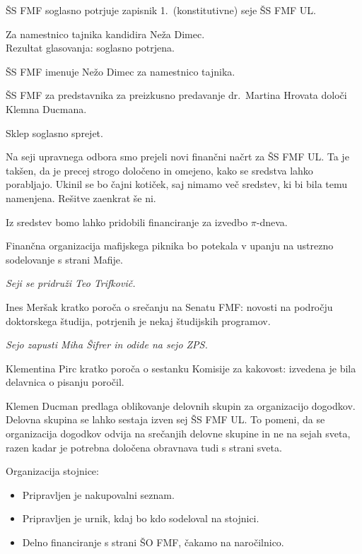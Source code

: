 \documentclass{seja}
\begin{document}
\begin{ad}

\item
  ŠS FMF soglasno potrjuje zapisnik 1.~(konstitutivne) seje ŠS FMF UL.

\item 
  Za namestnico tajnika kandidira Neža Dimec. \\
  Rezultat glasovanja: soglasno potrjena.
  
  \begin{sklep*}
    ŠS FMF imenuje Nežo Dimec za namestnico tajnika.
  \end{sklep*}
  
\item
  \begin{sklep}
    ŠS FMF za predstavnika za preizkusno predavanje dr.~Martina Hrovata določi Klemna Ducmana.
  \end{sklep}
  Sklep soglasno sprejet.
  
\item
  Na seji upravnega odbora smo prejeli novi finančni načrt za ŠS FMF UL. Ta je takšen, da je precej strogo določeno in omejeno, kako se sredstva lahko porabljajo. Ukinil se bo čajni kotiček, saj nimamo več sredstev, ki bi bila temu namenjena. Rešitve zaenkrat še ni.
  
  Iz sredstev bomo lahko pridobili financiranje za izvedbo $\pi$-dneva.
  
  Finančna organizacija mafijskega piknika bo potekala v upanju na ustrezno sodelovanje s strani Mafije.
  
  \textit{Seji se pridruži Teo Trifkovič.}
  
\item
  Ines Meršak kratko poroča o srečanju na Senatu FMF: novosti na področju doktorskega študija, potrjenih je nekaj študijskih programov.
  
  \textit{Sejo zapusti Miha Šifrer in odide na sejo ZPS.}
  
  Klementina Pirc kratko poroča o sestanku Komisije za kakovost: izvedena je bila delavnica o pisanju poročil.
  
\item
  Klemen Ducman predlaga oblikovanje delovnih skupin za organizacijo dogodkov. Delovna skupina se lahko sestaja izven sej ŠS FMF UL. To pomeni, da se organizacija dogodkov odvija na srečanjih delovne skupine in ne na sejah sveta, razen kadar je potrebna določena obravnava tudi s strani sveta.
  
  Organizacija stojnice:
  \begin{itemize}
      \item Pripravljen je nakupovalni seznam.
      \item Pripravljen je urnik, kdaj bo kdo sodeloval na stojnici.
      \item Delno financiranje s strani ŠO FMF, čakamo na naročilnico.
  \end{itemize}
  

\end{ad}
\end{document}
